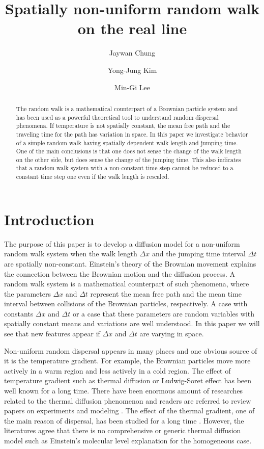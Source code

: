 \documentclass[11pt]{amsart}
\title[Random walk with location dependent travelling time]{Spatially non-uniform random walk on the real line}%
\author[Jaywan Chung]{Jaywan Chung}
\author[Yong-Jung Kim]{Yong-Jung Kim}
\author[Min-Gi Lee]{Min-Gi Lee}
\begin{document}
%
\begin{abstract}
  The random walk is a mathematical counterpart of a Brownian particle system and has been used as a powerful theoretical tool to understand random dispersal phenomena. If temperature is not spatially constant, the mean free path and the traveling time for the path has variation in space. In this paper we investigate behavior of a simple random walk having spatially dependent walk length and jumping time. One of the main conclusions is that one does not sense the change of the walk length on the other side, but does sense the change of the jumping time. This also indicates that a random walk system with a non-constant time step cannot be reduced to a constant time step one even if the walk length is rescaled.
\end{abstract}

\maketitle

\tableofcontents



\section{Introduction}

The purpose of this paper is to develop a diffusion model for a non-uniform random walk system when the walk length $\Delta x$ and the jumping time interval $\Delta t$ are spatially non-constant. Einstein's theory of the Brownian movement \cite{Einstein1905,Einstein1906} explains the connection between the Brownian motion and the diffusion process. A random walk system is a mathematical counterpart of such phenomena, where the parameters $\Delta x$ and $\Delta t$ represent the mean free path and the mean time interval between collisions of the Brownian particles, respectively. A case with constants $\Delta x$ and $\Delta t$ or a case that these parameters are random variables with spatially constant means and variations are well understood. In this paper we will see that new features appear if $\Delta x$ and $\Delta t$ are varying in space.

Non-uniform random dispersal appears in many places and one obvious source of it is the temperature gradient. For example, the Brownian particles move more actively in a warm region and less actively in a cold region. The effect of temperature gradient such as thermal diffusion or Ludwig-Soret effect  \cite{Ludwig1856,Soret1879} has been well known for a long time. There have been enormous amount of researches related to the thermal diffusion phenomenon and readers are referred to review papers on experiments and modeling  \cite{Braun2004, Duhr2006, Eslamian2009, Harstad2009, Huang2010,Putnam2007,Srinivasan2011}. The effect of the thermal gradient, one of the main reason of dispersal, has been studied for a long time \cite{Chapman1928,14}. However, the literatures agree that there is no comprehensive or generic thermal diffusion model such as Einstein's molecular level explanation for the homogeneous case.
\end{document}
